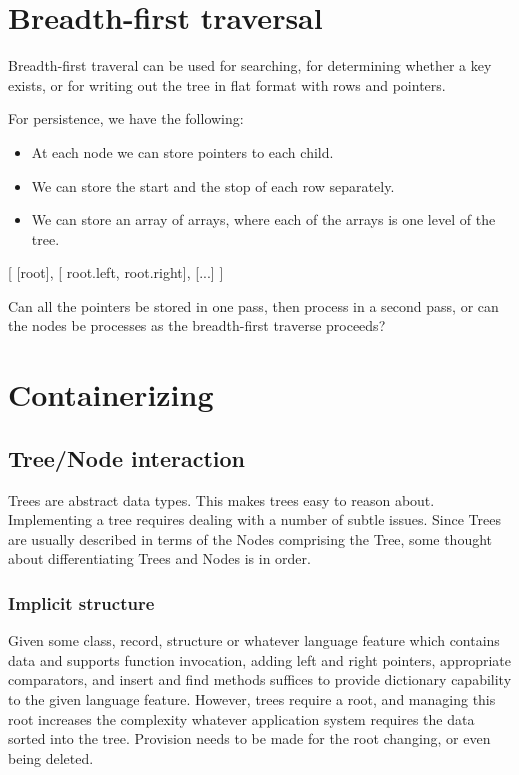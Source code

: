 \documentclass{article}
\begin{document}
\section{Breadth-first traversal}

Breadth-first traveral can be used for searching, for determining whether a key exists,
or for writing out the tree in flat format with rows and pointers.

For persistence, we have the following:

\begin{itemize}
\item At each node we can store pointers to each child.
\item We can store the start and the stop of each row separately.
\item We can store an array of arrays, where each of the arrays is
      one level of the tree.
\end{itemize}

[
 [root],
 [ root.left, root.right],
 [...]
]

Can all the pointers be stored in one pass, then process in a second pass,
or can the nodes be processes as the breadth-first traverse proceeds?



\section{Containerizing}

\subsection{Tree/Node interaction}

Trees are abstract data types. This makes trees easy to reason about.
Implementing a tree requires dealing with a number of subtle issues.
Since Trees are usually described in terms of the Nodes comprising
the Tree, some thought about differentiating Trees and Nodes is in order.

\subsubsection{Implicit structure}

Given some class, record, structure or whatever language feature which contains
data and supports function invocation, adding left and right pointers,
appropriate comparators, and insert and find methods suffices to provide
dictionary capability to the given language feature. However, trees require a
root, and managing this root increases the complexity whatever application
system requires the data sorted into the tree. Provision needs to be made for
the root changing, or even being deleted.
\end{document}
